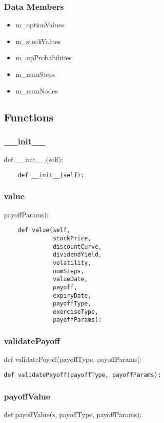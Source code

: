 \documentclass[twoside,11pt]{book}
\begin{document}
\subsubsection*{Data Members}
\begin{itemize}
\item{m\_optionValues}
\item{m\_stockValues}
\item{m\_upProbabilities}
\item{m\_numSteps}
\item{m\_numNodes}
\end{itemize}

\subsection*{Functions}

\subsubsection*{{\bf \_\_init\_\_}}
def \_\_init\_\_(self): 

\begin{lstlisting}
    def __init__(self):
\end{lstlisting}

\subsubsection*{{\bf value}}
payoffParams): 

\begin{lstlisting}
    def value(self,
              stockPrice,
              discountCurve,
              dividendYield,
              volatility,
              numSteps,
              valueDate,
              payoff,
              expiryDate,
              payoffType,
              exerciseType,
              payoffParams):
\end{lstlisting}

\subsubsection*{{\bf validatePayoff}}
def validatePayoff(payoffType, payoffParams): 

\begin{lstlisting}
def validatePayoff(payoffType, payoffParams):
\end{lstlisting}

\subsubsection*{{\bf payoffValue}}
def payoffValue(s, payoffType, payoffParams): 
\end{document}
